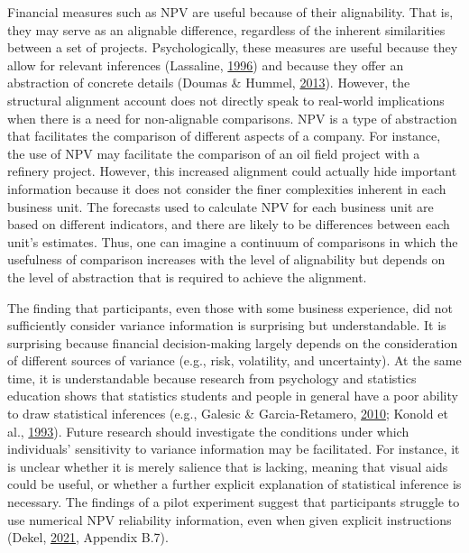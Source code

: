 \documentclass[
  english,
  man, donotrepeattitle,floatsintext]{apa7}
\theoremstyle{definition}
\theoremstyle{definition}
\theoremstyle{definition}
\theoremstyle{definition}
\theoremstyle{remark}
\begin{document}
Financial measures such as NPV are useful because of their alignability. That
is, they may serve as an alignable difference, regardless of the inherent
similarities between a set of projects. Psychologically, these measures are
useful because they allow for relevant inferences (Lassaline, \protect\hyperlink{ref-lassaline1996}{1996}) and because
they offer an abstraction of concrete details (Doumas \& Hummel, \protect\hyperlink{ref-doumas2013}{2013}). However, the
structural alignment account does not directly speak to real-world implications
when there is a need for non-alignable comparisons. NPV is a type of abstraction
that facilitates the comparison of different aspects of a company. For instance,
the use of NPV may facilitate the comparison of an oil field project with a
refinery project. However, this increased alignment could actually hide
important information because it does not consider the finer complexities
inherent in each business unit. The forecasts used to calculate NPV for each
business unit are based on different indicators, and there are likely to be
differences between each unit's estimates. Thus, one can imagine a continuum of
comparisons in which the usefulness of comparison increases with the level of
alignability but depends on the level of abstraction that is required to achieve
the alignment.

The finding that participants, even those with some business experience, did not
sufficiently consider variance information is surprising but understandable. It
is surprising because financial decision-making largely depends on the
consideration of different sources of variance (e.g., risk, volatility, and
uncertainty). At the same time, it is understandable because research from
psychology and statistics education shows that statistics students and people in
general have a poor ability to draw statistical inferences (e.g., Galesic \& Garcia-Retamero, \protect\hyperlink{ref-galesic2010}{2010}; Konold et al., \protect\hyperlink{ref-konold1993}{1993}). Future research should investigate the conditions under which
individuals' sensitivity to variance information may be facilitated. For
instance, it is unclear whether it is merely salience that is lacking, meaning
that visual aids could be useful, or whether a further explicit explanation of
statistical inference is necessary. The findings of a pilot experiment suggest
that participants struggle to use numerical NPV reliability information, even
when given explicit instructions (Dekel, \protect\hyperlink{ref-dekel2021b}{2021}, Appendix B.7).
\end{document}
